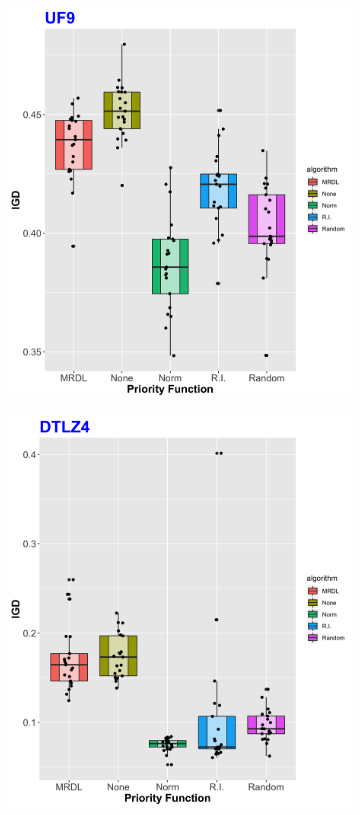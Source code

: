 \begin{figure}[!t]

	\begin{subfigure}[b]{0.33\textwidth}
		\centering
		\includegraphics[width=1\textwidth, height=0.77\textwidth]{images/UF9_IGD}
	\end{subfigure}
	\begin{subfigure}[b]{0.33\textwidth}
		\centering
		\includegraphics[width=1\textwidth, height=0.77\textwidth]{images/DTLZ4_IGD}
	\end{subfigure}
\begin{subfigure}[b]{0.33\textwidth}
	\centering

\end{subfigure}
\end{figure}
